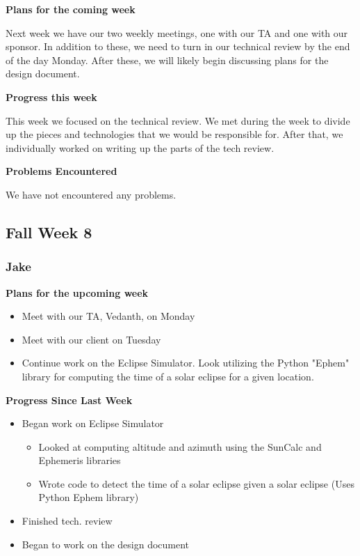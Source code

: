 \documentclass[10pt, onecolumn, draftclsnofoot, letterpaper, compsoc]{IEEEtran}
\begin{document}
    \noindent \textbf{Plans for the coming week}

    Next week we have our two weekly meetings, one with our TA and one with our
    sponsor. In addition to these, we need to turn in our technical review by the
    end of the day Monday. After these, we will likely begin discussing plans for
    the design document.

    \noindent \textbf{Progress this week}

    This week we focused on the technical review. We met during the week to divide
    up the pieces and technologies that we would be responsible for. After that,
    we individually worked on writing up the parts of the tech review.

    \noindent \textbf{Problems Encountered}

    We have not encountered any problems.

\subsection{Fall Week 8}

    \subsubsection{Jake}

    \noindent \textbf{Plans for the upcoming week}

    \begin{itemize}

    \item Meet with our TA, Vedanth, on Monday
    \item Meet with our client on Tuesday
    \item Continue work on the Eclipse Simulator. Look utilizing the Python "Ephem" library
     for computing the time of a solar eclipse for a given location.

    \end{itemize}

    \noindent \textbf{Progress Since Last Week}

    \begin{itemize}

    \item Began work on Eclipse Simulator

        \begin{itemize}
           \item Looked at computing altitude and azimuth using the SunCalc and Ephemeris libraries
           \item Wrote code to detect the time of a solar eclipse given a solar eclipse (Uses Python Ephem library)
       \end{itemize}

    \item Finished tech. review
    \item Began to work on the design document

    \end{itemize}
\end{document}
